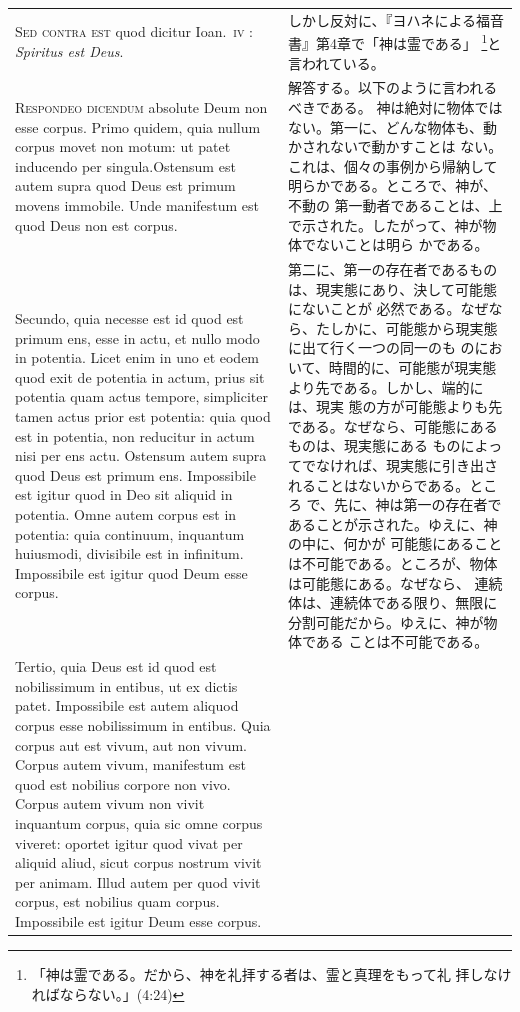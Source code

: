 \documentclass[paper=a4paper,fontsize=10pt,jafontsize=9pt,titlepage]{jlreq}
\begin{document}
\begin{longtable}{p{21em}p{21em}}
{\scshape Sed contra est} quod dicitur Ioan.~{\scshape iv} : {\itshape Spiritus est Deus}.

&
しかし反対に、『ヨハネによる福音書』第4章で「神は霊である」
 \footnote{「神は霊である。だから、神を礼拝する者は、霊と真理をもって礼
 拝しなければならない。」(4:24)}と言われている。

\\

{\scshape Respondeo dicendum} absolute Deum non esse corpus.  Primo quidem,
quia nullum corpus movet non motum: ut patet inducendo per
singula.Ostensum est autem supra quod Deus est primum movens immobile.
Unde manifestum est quod Deus non est corpus.

&

解答する。以下のように言われるべきである。
神は絶対に物体ではない。第一に、どんな物体も、動かされないで動かすことは
ない。これは、個々の事例から帰納して明らかである。ところで、神が、不動の
第一動者であることは、上で示された。したがって、神が物体でないことは明ら
かである。

\\


Secundo, quia necesse est id quod est primum ens, esse in actu, et nullo
modo in potentia.  Licet enim in uno et eodem quod exit de potentia in
actum, prius sit potentia quam actus tempore, simpliciter tamen actus
prior est potentia: quia quod est in potentia, non reducitur in actum
nisi per ens actu.  Ostensum autem supra quod Deus est primum ens.
Impossibile est igitur quod in Deo sit aliquid in potentia.  Omne autem
corpus est in potentia: quia continuum, inquantum huiusmodi, divisibile
est in infinitum.  Impossibile est igitur quod Deum esse corpus.


&

第二に、第一の存在者であるものは、現実態にあり、決して可能態にないことが
必然である。なぜなら、たしかに、可能態から現実態に出て行く一つの同一のも
のにおいて、時間的に、可能態が現実態より先である。しかし、端的には、現実
態の方が可能態よりも先である。なぜなら、可能態にあるものは、現実態にある
ものによってでなければ、現実態に引き出されることはないからである。ところ
で、先に、神は第一の存在者であることが示された。ゆえに、神の中に、何かが
可能態にあることは不可能である。ところが、物体は可能態にある。なぜなら、
連続体は、連続体である限り、無限に分割可能だから。ゆえに、神が物体である
ことは不可能である。

\\

Tertio, quia Deus est id quod est nobilissimum in entibus, ut ex dictis
patet.  Impossibile est autem aliquod corpus esse nobilissimum in
entibus.  Quia corpus aut est vivum, aut non vivum.  Corpus autem vivum,
manifestum est quod est nobilius corpore non vivo.  Corpus autem vivum
non vivit inquantum corpus, quia sic omne corpus viveret: oportet igitur
quod vivat per aliquid aliud, sicut corpus nostrum vivit per animam.
Illud autem per quod vivit corpus, est nobilius quam corpus.
Impossibile est igitur Deum esse corpus.


\end{longtable}
\end{document}

